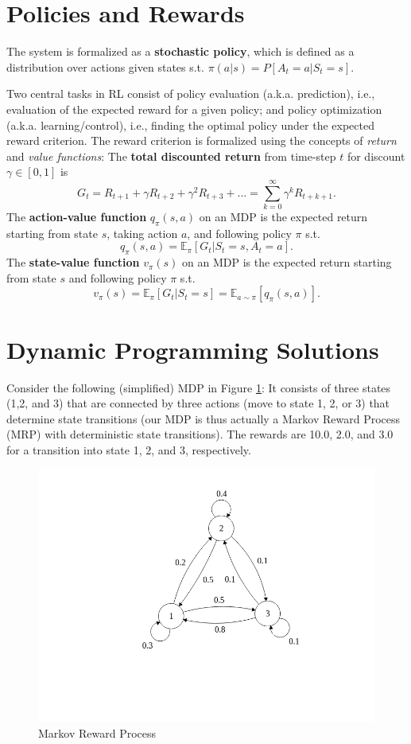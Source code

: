 \section{Policies and Rewards}

The system is formalized as a \textbf{stochastic policy}, which is defined as a distribution over actions given states s.t. $\pi(a|s) = P[A_t = a| S_t = s]$.

Two central tasks in RL consist of policy evaluation (a.k.a. prediction), i.e., evaluation of the expected reward for a given policy; and policy optimization (a.k.a. learning/control), i.e., finding the optimal policy under the expected reward criterion. The reward criterion is formalized using the concepts of \emph{return} and \emph{value functions}: The \textbf{total discounted return} from time-step $t$ for discount $\gamma \in [0,1]$ is
    \[ G_t = R_{t+1} + \gamma R_{t+2} + \gamma^2 R_{t+3} + \ldots = \sum_{k=0}^{\infty}\gamma^k R_{t+k+1}.\]    
    The \textbf{action-value function} $q_{\pi}(s,a)$ on an MDP is the expected return starting from state $s$, taking action $a$, and following policy $\pi$ s.t.
    \[ q_{\pi}(s,a) = \mathbb{E}_{\pi}[G_t | S_t = s, A_t = a].\]
    The \textbf{state-value function} $v_{\pi}(s)$ on an MDP is the expected return starting from state $s$ and following policy $\pi$ s.t.
    \[ v_{\pi}(s) = \mathbb{E}_{\pi}[G_t | S_t = s] = \mathbb{E}_{a \sim \pi}[q_{\pi}(s,a)] .\]
  

\section{Dynamic Programming Solutions}

Consider the following (simplified) MDP in Figure \ref{fig:MDP}: It consists of three states (1,2, and 3) that are connected by three actions (move to state 1, 2, or 3) that determine state transitions (our MDP is thus actually a Markov Reward Process (MRP) with deterministic state transitions). The rewards are 10.0, 2.0, and 3.0 for a transition into state 1, 2, and 3, respectively. 

\begin{figure}[!ht]
\centering
\includegraphics[scale=0.6]{figs/reinforcement_learning/mdp.png}
\caption{Markov Reward Process}
\label{fig:MDP}
\end{figure}

